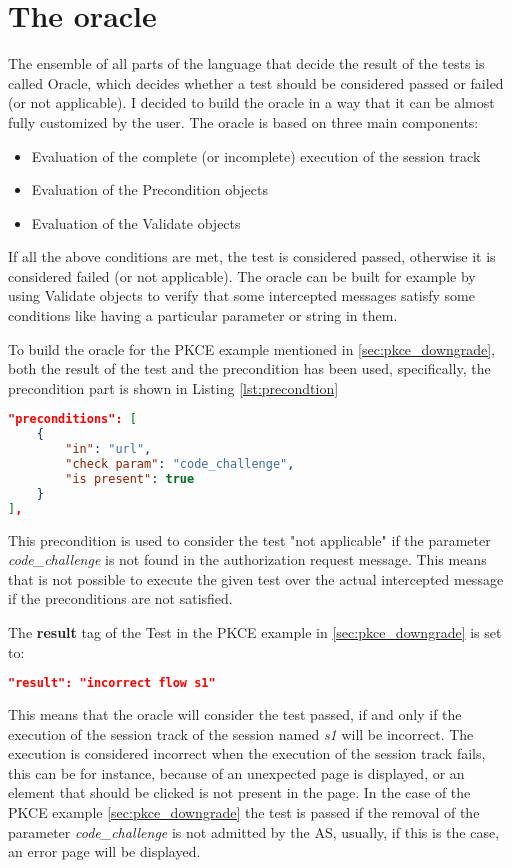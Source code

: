\section{The oracle}
The ensemble of all parts of the language that decide the result of the tests is called Oracle,
which decides whether a test should be considered passed or failed (or not applicable). I decided to build the oracle in a way that it can be almost fully customized by the user. 
The oracle is based on three main components:
\begin{itemize}
    \item Evaluation of the complete (or incomplete) execution of the \gls{session track} 
    \item Evaluation of the Precondition objects
    \item Evaluation of the Validate objects
\end{itemize}
If all the above conditions are met, the test is considered passed, otherwise it is considered failed (or not applicable).
The oracle can be built for example by using Validate objects to verify that some intercepted messages satisfy some conditions like having a particular parameter or string in them.

To build the oracle for the \gls{PKCE} example mentioned in \ref{sec:pkce_downgrade}, both the result of the test and the precondition has been used, specifically, the precondition part is shown in Listing \ref{lst:precondtion}
\begin{lstlisting}[language=json, caption=Precondition definition, label={lst:precondtion}]
"preconditions": [
    {
        "in": "url",
        "check param": "code_challenge",
        "is present": true
    }
],
\end{lstlisting}
This precondition is used to consider the test "not applicable" if the parameter \textit{code\_challenge} is not found in the authorization request message. This means that is not possible to execute the given test over the actual intercepted message if the preconditions are not satisfied.

The \textbf{result} tag of the Test in the \gls{PKCE} example in \ref{sec:pkce_downgrade} is set to:
\begin{lstlisting}[language=json]
"result": "incorrect flow s1"
\end{lstlisting}
This means that the oracle will consider the test passed, if and only if the execution of the \gls{session track} of the session named \textit{s1} will be incorrect. The execution is considered incorrect when the execution of the \gls{session track} fails, this can be for instance, because of an unexpected page is displayed, or an element that should be clicked is not present in the page. In the case of the PKCE example \ref{sec:pkce_downgrade} the test is passed if the removal of the parameter \textit{code\_challenge} is not admitted by the AS, usually, if this is the case, an error page will be displayed.


